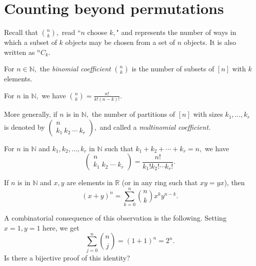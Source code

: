 


\section{Counting beyond permutations}

Recall that $\binom{n}{k},$ read ``$n$ choose $k,$"
and represents the number of ways in which a subset of $k$ objects 
may be chosen from a set of $n$ objects. It is also written as ${}^nC_k.$

\begin{definition}
	For $n \in \mathbb{N},$ the \emph{binomial coefficient} $\binom{n}{k}$
	is the number of subsets of $[n]$ with $k$ elements.
\end{definition}

\begin{proposition}
	For $n$ in $\mathbb{N},$ we have $\binom{n}{k} =  \frac{n!}{k! (n-k)!}.$	
\end{proposition}

More generally, if $n$ is in $\mathbb{N},$ the number of partitions of $[n]$
with sizes $k_1, \dotsc, k_r$ is denoted by
$\begin{pmatrix} n \\ k_1 \: k_2\: \cdots \: k_r \end{pmatrix},$
and called a \emph{multinomial coefficient.}

\begin{theorem}
	For $n$ in $\mathbb{N}$ and $k_1, k_2, \dotsc, k_r$ in $\mathbb{N}$ such that
	$k_1 + k_ 2 + \cdots + k_r = n,$ we have 
	$$ \begin{pmatrix} n \\ k_1 \; k_ 2 \; \cdots \; k_r \end{pmatrix}
	= \frac{n!}{k_1 ! k_2 ! \cdots k_r!}. $$
\end{theorem}

\begin{theorem}
	If $n$ is in $\mathbb{N}$ and $x, y $ are elements in $\mathbb{R}$ (or in any ring 
	such that $xy = yx$), then 
	$$ (x+y)^n = \sum_{k=0}^{n} \binom{n}{k} x^k y^{n-k} .$$
\end{theorem}
A combinatorial consequence of this observation is the following.
Setting $x=1, y=  1$ here, we get
$$\sum_{j=0}^{n} \binom{n}{j} = (1+1)^n = 2^n.$$
Is there a bijective proof of this identity?

